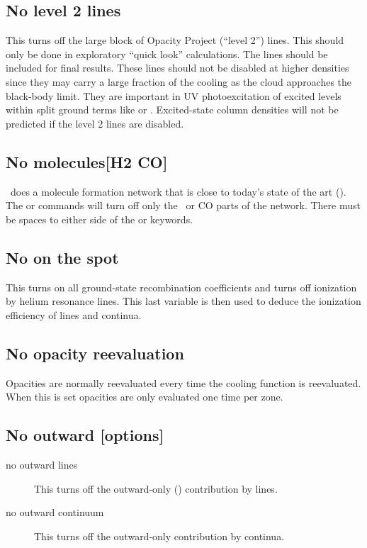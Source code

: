\subsection{No level 2 lines}

This turns off the large block of Opacity Project (``level 2'') lines.
This should only be done in exploratory ``quick look'' calculations.
The lines should be included for final results.
These lines should not
be disabled at higher densities since they may carry a large fraction of
the cooling as the cloud approaches the black-body limit.
They are
important in UV photoexcitation of excited levels within
split ground terms like \oi* or \cii*.
Excited-state column densities will not be predicted if
the level 2 lines are disabled.

\subsection{No molecules[H2 CO]}

\Cloudy\ does a molecule formation network that is close to
today's state
of the art (\citealp{Abel2005,Roellig2007}).
The 
or  commands will turn off only
the \htwo\ or CO parts of the network.
There must be spaces to either side of the  or
 keywords.

\subsection{No on the spot}

This turns on all ground-state recombination coefficients and turns off
ionization by helium resonance lines.
This last variable is then used to
deduce the ionization efficiency of lines and continua.

\subsection{No opacity reevaluation}

Opacities are normally reevaluated every time the cooling function is
reevaluated.
When this is set opacities are only evaluated one time per zone.

\subsection{No outward [options]  }
\begin{description}
\item[no outward lines]  This turns off the outward-only (\citealp{Tarter1967})
contribution by lines.

\item[no outward continuum]  This turns off the outward-only contribution by
continua.
\end{description}

